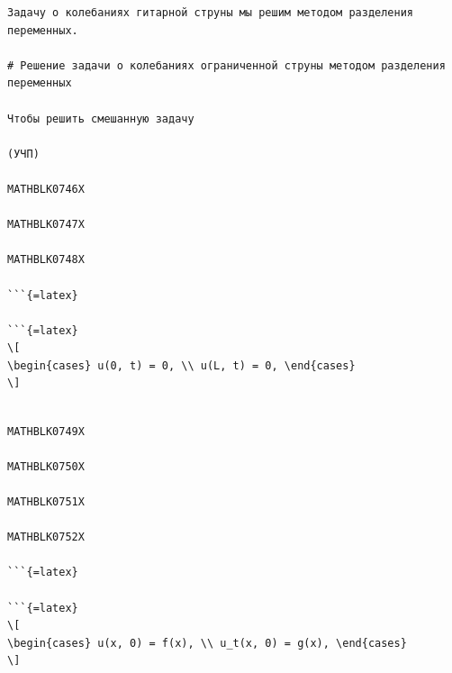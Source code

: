 \documentclass[
]{article}
\begin{document}
\begin{verbatim}
Задачу о колебаниях гитарной струны мы решим методом разделения переменных.

# Решение задачи о колебаниях ограниченной струны методом разделения переменных

Чтобы решить смешанную задачу

(УЧП)

MATHBLK0746X

MATHBLK0747X

MATHBLK0748X

```{=latex}

```{=latex}
\[
\begin{cases} u(0, t) = 0, \\ u(L, t) = 0, \end{cases}
\]
\end{verbatim}

\begin{verbatim}

MATHBLK0749X

MATHBLK0750X

MATHBLK0751X

MATHBLK0752X

```{=latex}

```{=latex}
\[
\begin{cases} u(x, 0) = f(x), \\ u_t(x, 0) = g(x), \end{cases}
\]
\end{verbatim}
\end{document}
